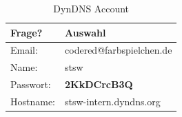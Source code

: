 \begin{table}[htbp]
\begin{center}
\begin{tabular*}{0.95\textwidth}{p{}p{}}
\hline
\textbf{Frage?} & \textbf{Auswahl} \\
\hline
Email: & codered@farbspielchen.de \\
Name: & stsw \\
Passwort: & \textbf{2KkDCrcB3Q} \\
Hostname: & stsw-intern.dyndns.org \\
\hline
\end{tabular*}
\caption{DynDNS Account}
\label{table:DynDNS Account}
\end{center}
\end{table}

